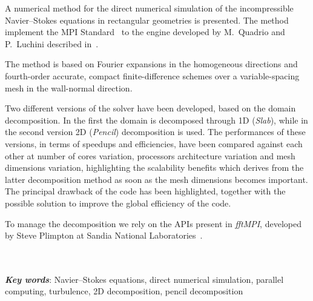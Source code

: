 \documentclass[a4paper,twosides,openright,titlepage]{book}
\newenvironment{abstract}%
	{\cleardoublepage%
		\thispagestyle{empty}%
		\null \vfill\begin{center}%
		\bfseries \abstractname \end{center}}%
	{\vfill\null}
\begin{document}
\begin{abstract}
\hrulefill

A numerical method for the direct numerical simulation of the incompressible Navier–Stokes equations in rectangular geometries is presented. The method implement the MPI Standard~\cite{MPI} to the engine developed by M.~Quadrio and P.~Luchini described in~\cite{cpl:presentazione}. 

The method is based on Fourier expansions in the homogeneous directions and fourth-order accurate, compact finite-difference schemes over a variable-spacing mesh in the wall-normal direction. 

Two different versions of the solver have been developed, based on the domain decomposition.  In the first the domain is decomposed through 1D (\emph{Slab}), while in the second version 2D (\emph{Pencil}) decomposition is used.
The performances of these versions, in terms of speedups and efficiencies, have been compared against each other at number of cores variation, processors architecture variation and mesh dimensions variation, highlighting the scalability benefits which derives from the latter decomposition method as soon as the mesh dimensions becomes important. The principal drawback of the code has been highlighted, together with the possible solution to improve the global efficiency of the code.  

To manage the decomposition we rely on the APIs present in \emph{fftMPI}, developed by Steve Plimpton at Sandia National Laboratories~\cite{fftMPI}. \\~\\~\par

\textbf{\textit{Key words}}: Navier–Stokes equations, direct numerical simulation, parallel computing, turbulence, 2D decomposition, pencil decomposition

\hrulefill
\end{abstract}
\end{document}
